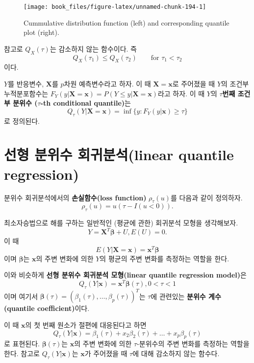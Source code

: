 \documentclass[b5paper,]{scrbook}
\theoremstyle{plain}
\theoremstyle{definition}
\numberwithin{equation}{section}
\let\BeginKnitrBlock\begin \let\EndKnitrBlock\end
\begin{document}
\begin{figure}

{\centering \texttt{[image: book\_files/figure-latex/unnamed-chunk-194-1]} 

}

\caption{Cummulative distribution function (left) and corresponding quantile plot (right).}\label{fig:unnamed-chunk-194}
\end{figure}

참고로 \(Q_{X}(\tau)\)는 감소하지 않는 함수이다. 즉
\[Q_{X}(\tau_{1}) \leq Q_{X}(\tau_{2}) \qquad{ \text{for } \tau_{1} < \tau_{2}}\]
이다.

\BeginKnitrBlock{definition}[조건부 분위수]
\protect\hypertarget{def:unnamed-chunk-195}{}{\label{def:unnamed-chunk-195}
{} }\(Y\)를 반응변수, \(\mathbf{X}\)를
\(p\)차원 예측변수라고 하자. 이 때 \(\mathbf{X}=\mathbf{x}\)로 주어졌을
때 \(Y\)의 조건부 누적분포함수는
\(F_{Y}(y|\mathbf{X}=\mathbf{x})=P(Y\leq y|\mathbf{X}=\mathbf{x})\)라고
하자. 이 때 \(Y\)의 \(\tau\)\textbf{번째 조건부 분위수
(}\(\tau\)\textbf{-th conditional quantile)}는
\[Q_{\tau}(Y|\mathbf{X}=\mathbf{x})=\inf\{y:F_{Y}(y|\mathbf{x})\geq \tau\}\]
로 정의된다.
\EndKnitrBlock{definition}

\section{선형 분위수 회귀분석(linear quantile
regression)}\label{--linear-quantile-regression}

분위수 회귀분석에서의 \textbf{손실함수(loss function)}
\(\rho_{\tau}(u)\)를 다음과 같이 정의하자.
\[\rho_{\tau}(u)=u(\tau -I(u<0)).\]

최소자승법으로 해를 구하는 일반적인 (평균에 관한) 회귀분석 모형을
생각해보자. \[Y=\mathbf{X}^{T}\boldsymbol{\beta}+U, E(U)=0.\] 이 때
\[E(Y|\mathbf{X}=\mathbf{x})=\mathbf{x}^{T}\boldsymbol{\beta}\] 이며
\(\boldsymbol{\beta}\)는 \(\mathbf{x}\)의 주변 변화에 의한 \(Y\)의
평균의 주변 변화를 측정하는 역할을 한다.

이와 비슷하게 \textbf{선형 분위수 회귀분석 모형(linear quantile
regression model)}은
\[Q_{\tau}(Y|\mathbf{x})=\mathbf{x}^{T}\boldsymbol{\beta}(\tau), 0<\tau <1\]
이며 여기서
\(\boldsymbol{\beta}(\tau)=(\beta_{1}(\tau),\ldots , \beta_{p}(\tau))^{T}\)는
\(\tau\)에 관련있는 \textbf{분위수 계수(quantile coefficient)}이다.

이 때 \(\mathbf{x}\)의 첫 번째 원소가 절편에 대응된다고 하면
\[Q_{\tau}(Y|\mathbf{x})=\beta_{1}(\tau)+x_{2}\beta_{2}(\tau)+\ldots +x_{p}\beta_{p}(\tau)\]
로 표현된다. \(\boldsymbol{\beta}(\tau)\)는 \(\mathbf{x}\)의 주변 변화에
의한 \(\tau\)-분위수의 주변 변화를 측정하는 역할을 한다. 참고로
\(Q_{\tau}(Y|\mathbf{x})\)는 \(\mathbf{x}\)가 주어졌을 때 \(\tau\)에
대해 감소하지 않는 함수다.
\end{document}
